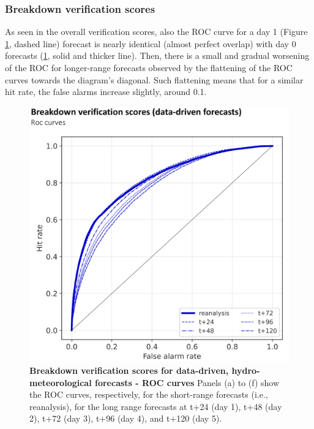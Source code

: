 \subsubsection{Breakdown verification scores}

As seen in the overall verification scores, also the ROC curve for a day 1 (Figure \ref{fig:hydro_based_ff_verif_breakdown_scores_roc}, dashed line) forecast is nearly identical (almost perfect overlap) with day 0 forecasts (\ref{fig:hydro_based_ff_verif_breakdown_scores_roc}, solid and thicker line). Then, there is a small and gradual worsening of the ROC for longer-range forecasts observed by the flattening of the ROC curves towards the diagram's diagonal. Such flattening means that for a similar hit rate, the false alarms increase slightly, around 0.1.

\begin{figure}[htbp]
\centering
\includegraphics[width=\textwidth]{hydro_based_ff_verif_breakdown_scores_roc.png}
\caption{\textbf{Breakdown verification scores for data-driven, hydro-meteorological forecasts - ROC curves} Panels (a) to (f) show the ROC curves, respectively, for the short-range forecasts (i.e., reanalysis), for the long range forecasts at t+24 (day 1), t+48 (day 2), t+72 (day 3), t+96 (day 4), and t+120 (day 5).}
\label{fig:hydro_based_ff_verif_breakdown_scores_roc}
\end{figure}

